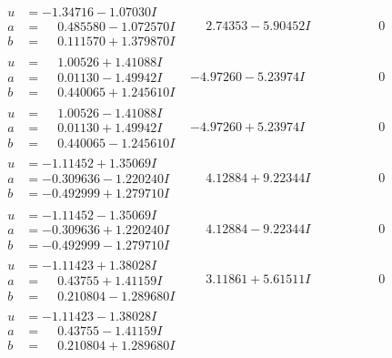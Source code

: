 \documentclass[1p]{elsarticle_modified}
\theoremstyle{definition}
\begin{document}
$$\begin{array}{c|c|c}
\begin{aligned}
u &= -1.34716 - 1.07030 I \\
a &= \phantom{-}0.485580 - 1.072570 I \\
b &= \phantom{-}0.111570 + 1.379870 I\end{aligned}
 & \phantom{-}2.74353 - 5.90452 I & \phantom{-0.000000 } 0 \\ \hline\begin{aligned}
u &= \phantom{-}1.00526 + 1.41088 I \\
a &= \phantom{-}0.01130 - 1.49942 I \\
b &= \phantom{-}0.440065 + 1.245610 I\end{aligned}
 & -4.97260 - 5.23974 I & \phantom{-0.000000 } 0 \\ \hline\begin{aligned}
u &= \phantom{-}1.00526 - 1.41088 I \\
a &= \phantom{-}0.01130 + 1.49942 I \\
b &= \phantom{-}0.440065 - 1.245610 I\end{aligned}
 & -4.97260 + 5.23974 I & \phantom{-0.000000 } 0 \\ \hline\begin{aligned}
u &= -1.11452 + 1.35069 I \\
a &= -0.309636 - 1.220240 I \\
b &= -0.492999 + 1.279710 I\end{aligned}
 & \phantom{-}4.12884 + 9.22344 I & \phantom{-0.000000 } 0 \\ \hline\begin{aligned}
u &= -1.11452 - 1.35069 I \\
a &= -0.309636 + 1.220240 I \\
b &= -0.492999 - 1.279710 I\end{aligned}
 & \phantom{-}4.12884 - 9.22344 I & \phantom{-0.000000 } 0 \\ \hline\begin{aligned}
u &= -1.11423 + 1.38028 I \\
a &= \phantom{-}0.43755 + 1.41159 I \\
b &= \phantom{-}0.210804 - 1.289680 I\end{aligned}
 & \phantom{-}3.11861 + 5.61511 I & \phantom{-0.000000 } 0 \\ \hline\begin{aligned}
u &= -1.11423 - 1.38028 I \\
a &= \phantom{-}0.43755 - 1.41159 I \\
b &= \phantom{-}0.210804 + 1.289680 I\end{aligned}

\end{array}$$
\end{document}
